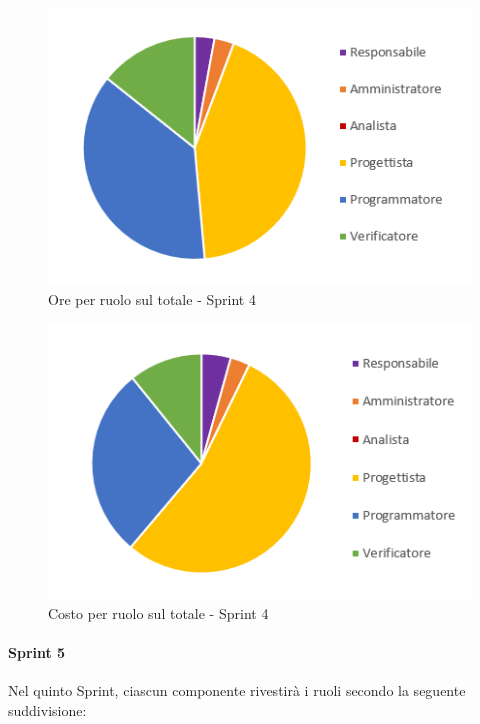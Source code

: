 \begin{figure}[H]
  \centering
  \includegraphics[scale=0.8]{immagini/4Sprint_oreRuolo.png}
  \caption{Ore per ruolo sul totale - Sprint 4}
\end{figure}

\begin{figure}[H]
  \centering
  \includegraphics[scale=0.8]{immagini/4Sprint_costoRuolo.png}
  \caption{Costo per ruolo sul totale - Sprint 4}
\end{figure}
\pagebreak


\paragraph{Sprint 5}
Nel quinto Sprint\glo{}, ciascun componente rivestirà i ruoli secondo la seguente suddivisione:

